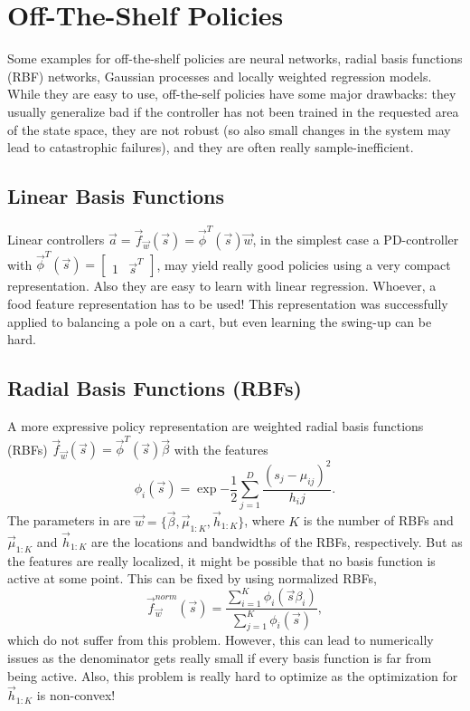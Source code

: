 	\section{Off-The-Shelf Policies}
		Some examples for off-the-shelf policies are neural networks, radial basis functions (RBF) networks, Gaussian processes and locally weighted regression models. While they are easy to use, off-the-self policies have some major drawbacks: they usually generalize bad if the controller has not been trained in the requested area of the state space, they are not robust (so also small changes in the system may lead to catastrophic failures), and they are often really sample-inefficient.

		\subsection{Linear Basis Functions}
			Linear controllers \( \vec{a} = \vec{f}_{\vec{w}}(\vec{s}) = \vec{\phi}^T(\vec{s}) \vec{w} \), in the simplest case a PD-controller with \( \vec{\phi}^T(\vec{s}) = \begin{bmatrix} 1 & \vec{s}^T \end{bmatrix} \), may yield really good policies using a very compact representation. Also they are easy to learn with linear regression. Whoever, a food feature representation has to be used! This representation was successfully applied to balancing a pole on a cart, but even learning the swing-up can be hard.

		\subsection{Radial Basis Functions (RBFs)}
			A more expressive policy representation are weighted radial basis functions (RBFs) \( \vec{f}_{\vec{w}}(\vec{s}) = \vec{\phi}^T(\vec{s}) \vec{\beta} \) with the features
			\begin{equation*}
				\phi_i(\vec{s}) = \exp{ -\frac{1}{2} \sum_{j = 1}^{D} \frac{(s_j - \mu_{ij})^2}{h_ij} }.
			\end{equation*}
			The parameters in are \( \vec{w} = \{ \vec{\beta}, \vec{\mu}_{1:K}, \vec{h}_{1:K} \} \), where \(K\) is the number of RBFs and \(\vec{\mu}_{1:K}\) and \(\vec{h}_{1:K}\) are the locations and bandwidths of the RBFs, respectively. But as the features are really localized, it might be possible that no basis function is active at some point. This can be fixed by using normalized RBFs,
			\begin{equation*}
				\vec{f}_{\vec{w}}^\mathit{norm}(\vec{s}) = \frac{\sum_{i = 1}^{K} \phi_i(\vec{s} \beta_i)}{\sum_{j = 1}^{K} \phi_i(\vec{s})},
			\end{equation*}
			which do not suffer from this problem. However, this can lead to numerically issues as the denominator gets really small if every basis function is far from being active. Also, this problem is really hard to optimize as the optimization for \( \vec{h}_{1:K} \) is non-convex!

